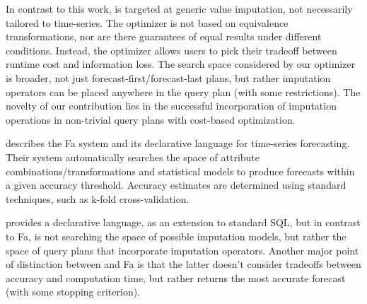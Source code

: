 In contrast to this work, \ProjectName{} is targeted at generic value imputation, not necessarily tailored to 
time-series. The optimizer is not based on equivalence transformations, nor are there guarantees of equal
results under different conditions. Instead, the optimizer allows users to pick their tradeoff between
runtime cost and information loss. The search space considered by our optimizer is broader, not just
forecast-first/forecast-last plans, but rather imputation operators can be placed anywhere in the query plan
(with some restrictions). The novelty of our contribution lies in the successful incorporation of
imputation operations in non-trivial query plans with cost-based optimization.

\cite{duan2007processing} describes the Fa system and its declarative language for time-series forecasting. Their
system automatically searches the space of attribute combinations/transformations and statistical models
to produce forecasts within a given accuracy threshold. Accuracy estimates are determined using
standard techniques, such as k-fold cross-validation. 

\ProjectName{} provides a declarative language, as
an extension to standard SQL, but in contrast to Fa, \ProjectName{} is not searching the space of possible
imputation models, but rather the space of query plans that incorporate imputation operators. Another major point
of distinction between \ProjectName{} and Fa is that the latter doesn't consider tradeoffs between accuracy and computation time, 
but rather returns the most accurate forecast (with some stopping criterion).



